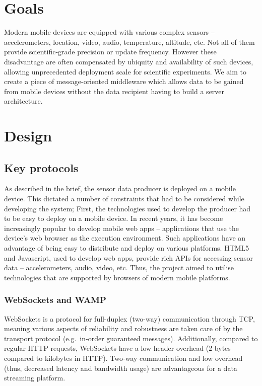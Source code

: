
\section{Goals}\label{goals}

Modern mobile devices are equipped with various complex sensors --
accelerometers, location, video, audio, temperature, altitude, etc. Not
all of them provide scientific-grade precision or update frequency.
However these disadvantage are often compensated by ubiquity and
availability of such devices, allowing unprecedented deployment scale
for scientific experiments. We aim to create a piece of message-oriented
middleware which allows data to be gained from mobile devices without
the data recipient having to build a server architecture.

\section{Design}\label{design}

\subsection{Key protocols}\label{key-protocols}

As described in the brief, the sensor data producer is deployed on a
mobile device. This dictated a number of constraints that had to be
considered while developing the system; First, the technologies used to
develop the producer had to be easy to deploy on a mobile device. In
recent years, it has become increasingly popular to develop mobile web
apps -- applications that use the device's web browser as the execution
environment. Such applications have an advantage of being easy to
distribute and deploy on various platforms. HTML5 and Javascript, used
to develop web apps, provide rich APIs for accessing sensor data --
accelerometers, audio, video, etc. Thus, the project aimed to utilise
technologies that are supported by browsers of modern mobile platforms.

\subsubsection{WebSockets and WAMP}\label{websockets-and-wamp}

WebSockets is a protocol for full-duplex (two-way) communication through
TCP, meaning various aspects of reliability and robustness are taken
care of by the transport protocol (e.g.~in-order guaranteed messages).
Additionally, compared to regular HTTP requests, WebSockets have a low
header overhead (2 bytes compared to kilobytes in HTTP). Two-way
communication and low overhead (thus, decreased latency and bandwidth
usage) are advantageous for a data streaming platform.

